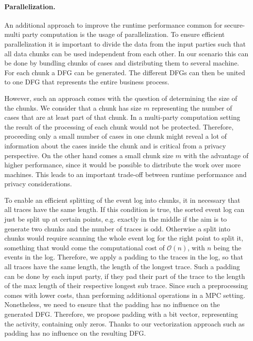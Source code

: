 \paragraph{Parallelization.}
An additional approach to improve the runtime performance common for 
secure-multi party computation is the usage of parallelization. To ensure 
efficient parallelization it is important to divide the data from the input 
parties such that all data chunks can be used independent from each other. In 
our scenario this can be done by bundling chunks of cases and distributing them 
to several machine.  For each chunk a DFG can be generated. The different DFGs 
can then be united to one DFG that represents the entire business process. 

However, such an approach comes with the question of determining the size of the chunks. We consider that a chunk has size $m$ representing the number of cases that are at least part of that chunk. In a multi-party computation setting the result of the processing of each chunk would not be protected. Therefore, proceeding only a small number of cases in one chunk might reveal a lot of information about the cases inside the chunk and is critical from a privacy perspective. On the other hand comes a small chunk size $m$ with the advantage of higher performance, since it would be possible to distribute the work over more machines. This leads to an important trade-off between runtime performance and privacy considerations. 

To enable an efficient splitting of  the event log into chunks, it in necessary that all traces have the same length. If this condition is true, the sorted event log can just be split up at certain points, e.g. exactly in the middle if the aim is to generate two chunks and the number of traces is odd. Otherwise a split into chunks would require scanning the whole event log for the right point to split it, something that would come the computational cost of $\mathcal{O}(n)$, with $n$ being the events in the log. Therefore, we apply a padding to the traces in the log, so that all traces have the same length, the length of the longest trace. Such a padding can be done by each input party, if they pad their part of the trace to the length of the max length of their respective longest sub trace. Since such a preprocessing comes with lower costs, than performing additional operations in a MPC setting. Nonetheless, we need to ensure that the padding has no influence on the generated DFG. Therefore, we propose padding with a bit vector, representing the activity, containing only zeros. Thanks to our vectorization approach such as padding has no influence on the resulting DFG.